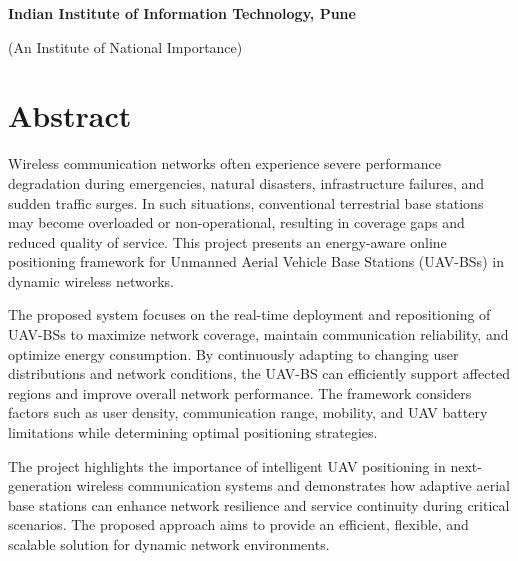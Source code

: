 \documentclass[12pt]{report}
\begin{document}
\begin{titlepage}
\begin{center}
\vspace{0.5cm}

\textbf{
Indian Institute of Information Technology, Pune
}

\vspace{0.3cm}

(An Institute of National Importance)

\vspace{1cm}


\end{center}

\end{titlepage}

\tableofcontents
\newpage
\chapter*{Abstract}

Wireless communication networks often experience severe performance degradation during emergencies, natural disasters, infrastructure failures, and sudden traffic surges. In such situations, conventional terrestrial base stations may become overloaded or non-operational, resulting in coverage gaps and reduced quality of service. This project presents an energy-aware online positioning framework for Unmanned Aerial Vehicle Base Stations (UAV-BSs) in dynamic wireless networks.

The proposed system focuses on the real-time deployment and repositioning of UAV-BSs to maximize network coverage, maintain communication reliability, and optimize energy consumption. By continuously adapting to changing user distributions and network conditions, the UAV-BS can efficiently support affected regions and improve overall network performance. The framework considers factors such as user density, communication range, mobility, and UAV battery limitations while determining optimal positioning strategies.

The project highlights the importance of intelligent UAV positioning in next-generation wireless communication systems and demonstrates how adaptive aerial base stations can enhance network resilience and service continuity during critical scenarios. The proposed approach aims to provide an efficient, flexible, and scalable solution for dynamic network environments.
\end{document}
